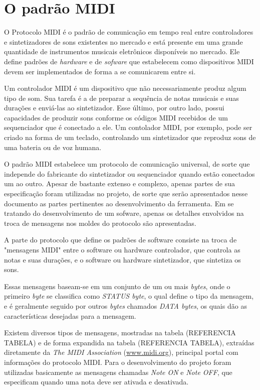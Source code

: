 \documentclass[12pt]{report}
\begin{document}
{\chapter{O padrão MIDI}
\label{cha:midi}

O Protocolo MIDI\cite{midi} é o padrão de comunicação em tempo real
entre controladores e sintetizadores de sons existentes no mercado e
está presente em uma grande quantidade de instrumentos musicais
eletrônicos disponíveis no mercado. Ele define padrões de {\it
  hardware} e de {\it sofware} que estabelecem como dispositivos MIDI
devem ser implementados de forma a se comunicarem entre si.

Um controlador MIDI é um dispositivo que não necessariamente produz
algum tipo de som. Sua tarefa é a de preparar a sequência de notas
musicais e suas durações e enviá-las ao sintetizador. Esse último, por
outro lado, possui capacidades de produzir sons conforme os códigos
MIDI recebidos de um sequenciador que é conectado a ele. Um contolador
MIDI, por exemplo, pode ser criado na forma de um teclado, controlando
um sintetizador que reproduz sons de uma bateria ou de voz humana.

O padrão MIDI estabelece um protocolo de comunicação universal, de
sorte que independe do fabricante do sintetizador ou sequenciador
quando estão conectados um ao outro. Apesar de bastante extenso e
complexo, apenas partes de sua especificação foram utilizadas no
projeto, de sorte que serão apresentados nesse documento as partes
pertinentes ao desenvolvimento da ferramenta. Em se tratando do
desenvolvimento de um sofware, apenas os detalhes envolvidos na
troca de mensagens nos moldes do protocolo são apresentadas.

A parte do protocolo que define os padrões de software consiste na
troca de "mensagens MIDI" entre o software ou hardware controlador,
que controla as notas e suas durações, e o software ou hardware
sintetizador, que sintetiza os sons.

Essas mensagens baseam-se em um conjunto de um ou mais {\it bytes},
onde o primeiro {\it byte} se classifica como {\it STATUS byte}, o
qual define o tipo da mensagem, e é geralmente seguido por outros {\it
  bytes} chamados {\it DATA bytes}, os quais dão as características
desejadas para a mensagem.

Existem diversos tipos de mensagens, mostradas na tabela (REFERENCIA
TABELA) e de forma expandida na tabela (REFERENCIA TABELA), extraídas
diretamente da {\it The MIDI Association} (\url{www.midi.org}),
principal portal com informações do protocolo MIDI. Para o
desenvolvimento do projeto foram utilizadas basicamente as mensagens
chamadas {\it Note ON} e {\it Note OFF}, que especificam quando uma
nota deve ser ativada e desativada.

}
\end{document}
